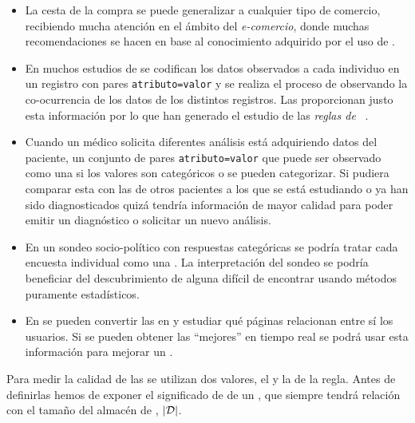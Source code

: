 \begin{itemize}
  \item La cesta de la compra se puede generalizar a cualquier tipo de comercio, recibiendo mucha atención en el ámbito del \emph{e-comercio}, donde muchas recomendaciones se hacen en base al conocimiento adquirido por el uso de \ars.
  \item En muchos estudios de \clasificacion se codifican los datos observados a cada individuo en un registro con pares \texttt{atributo=valor} y se realiza el proceso de \clasificacion observando la co-ocurrencia de los datos de los distintos registros. Las \ars proporcionan justo esta información por lo que han generado el estudio de las \emph{reglas de \clasificacion}~\citep{LiuHsuMa-IntegratingClassificationAndARM-1998,ThabtahCowlingHammoud-ImprovingRuleSorting-2006,KahramanliAllahverdi_NewMethodForComposingClassificationRulesARplusOPTBP_2009}.
  \item Cuando un médico solicita diferentes análisis está adquiriendo datos del paciente, un conjunto de pares \texttt{atributo=valor} que puede ser observado como una \transaccion si los valores son categóricos o se pueden categorizar. Si pudiera comparar esta \transaccion con las \transacciones de otros pacientes a los que se está estudiando o ya han sido diagnosticados quizá tendría información de mayor calidad para poder emitir un diagnóstico o solicitar un nuevo análisis.
  \item En un sondeo socio-político con respuestas categóricas se podría tratar cada encuesta individual como una \transaccion. La interpretación del sondeo se podría beneficiar del descubrimiento de alguna \ar difícil de encontrar usando métodos puramente estadísticos.
  \item En \wum se pueden convertir las \sns en \transacciones y estudiar qué páginas relacionan entre sí los usuarios. Si se pueden obtener las "`mejores"' \ars en tiempo real se podrá usar esta información para mejorar un \srw.
\end{itemize}






Para medir la calidad de las \ARs se utilizan dos valores, el \soporte y la \confianza de la regla. Antes de definirlas hemos de exponer el significado de \soporte de un \itemset, que siempre tendrá relación con el tamaño del almacén de \transacciones, $|\D|$.

